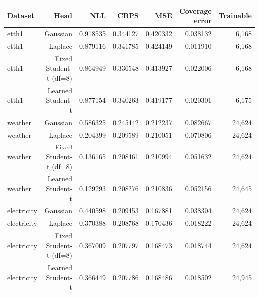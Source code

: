 \begin{tabular}{@{}lrrrrrr@{}}
\toprule
Dataset & Head & NLL & CRPS & MSE & Coverage error & Trainable \\
\midrule
etth1 & Gaussian & 0.918535 & 0.344127 & 0.420332 & 0.038132 & 6,168 \\
etth1 & Laplace & 0.879116 & 0.341785 & 0.424149 & 0.011910 & 6,168 \\
etth1 & Fixed Student-t (df=8) & 0.864949 & 0.336548 & 0.413927 & 0.022006 & 6,168 \\
etth1 & Learned Student-t & 0.877154 & 0.340263 & 0.419177 & 0.020301 & 6,175 \\
weather & Gaussian & 0.586325 & 0.245442 & 0.212237 & 0.082667 & 24,624 \\
weather & Laplace & 0.204399 & 0.209589 & 0.210051 & 0.070806 & 24,624 \\
weather & Fixed Student-t (df=8) & 0.136165 & 0.208461 & 0.210994 & 0.051632 & 24,624 \\
weather & Learned Student-t & 0.129293 & 0.208276 & 0.210836 & 0.052156 & 24,645 \\
electricity & Gaussian & 0.440598 & 0.209453 & 0.167881 & 0.038304 & 24,624 \\
electricity & Laplace & 0.370388 & 0.208768 & 0.170436 & 0.018222 & 24,624 \\
electricity & Fixed Student-t (df=8) & 0.367009 & 0.207797 & 0.168473 & 0.018744 & 24,624 \\
electricity & Learned Student-t & 0.366449 & 0.207786 & 0.168486 & 0.018502 & 24,945 \\
\bottomrule
\end{tabular}
